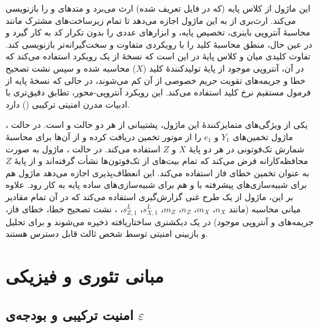 این ماژول از کلاس پایه  (که در فایل  تعریف شده) ارث می‌برد و متدهای  و  را بازنویسی می‌کند. ارث‌بری از  به این ماژول اجازه می‌دهد تا تمام زیرساخت‌های مشترک مانند محاسبۀ آنتروپی باینری، تخصیص \lr{$\varepsilon$} پایه، و ابزارهای  عددی را بدون تکرار کد به کار گیرد و در عین حال، منطق محاسبۀ کلید را با رویکردی متفاوت و سخت‌گیرانه‌تر بازنویسی کند. تفاوت کلیدی میان  و کلاس پایۀ  در این است که نسخۀ  از یک رویکرد  استفاده می‌کند که در آن، آنتروپی موجود از پایۀ تولید‌کنندۀ کلید ($X$) محاسبه شده و سپس نشت تصحیح خطا و جریمه‌های تقویت حریم خصوصی از آن کم می‌شوند، در حالی که نسخۀ پایه از فرمول مستقیم نرخ کلید استفاده می‌کند. این رویکرد آنتروپی-محور، تطابق دقیق‌تری با ادبیات مدرن امنیتی ترکیبی () دارد.

یکی از ویژگی‌های متمایزکنندۀ این ماژول، پشتیبانی از هر دو حالت  و  است. در حالت ، ماژول تخمین‌های $Y_1$ و $e_1$ را از موتور تخمین  دریافت کرده و از آن‌ها برای محاسبۀ شمارش تک‌فوتونی در هر دو پایۀ $X$ و $Z$ استفاده می‌کند. در حالت ، ماژول به صورت محافظه‌کارانه فرض می‌کند که تمام بیت‌های  از تک‌فوتون‌ها نشأت گرفته‌اند و از  پایۀ $Z$ به عنوان تخمین خطای فاز استفاده می‌کند. این انعطاف‌پذیری اجازه می‌دهد ماژول هم برای شبیه‌سازی‌های پیشرفته با  و هم برای شبیه‌سازی‌های ساده  پایه به کار رود. علاوه بر این، ماژول از یک طرح غنی گزارش‌گیری  استفاده می‌کند که در آن تمام مقادیر میانی محاسبه (مانند $n_X$، $m_X$، $n_Z$، $m_Z$، $s_{X,1}^L$، $s_{Z,1}^L$، ، نشت تصحیح خطا، خطای فاز، جریمه‌های  و آنتروپی موجود) در یک دیکشنری ساختاریافته ذخیره می‌شوند و برای تحلیل و بازبینی امنیتی توسط شخص ثالث قابل دسترس هستند.

\section{مبانی تئوری و فیزیکی}

\subsection{امنیت ترکیبی و بودجه‌ی $\varepsilon$}

